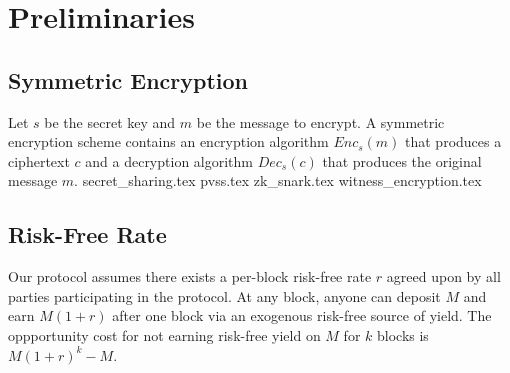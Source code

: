 \section{Preliminaries}
    \subsection{Symmetric Encryption}
    Let $s$ be the secret key and $m$ be the message to encrypt.
    A symmetric encryption scheme contains an encryption algorithm $Enc_s(m)$ that produces a ciphertext $c$ and a decryption algorithm $Dec_s(c)$ that produces the original message $m$.
    {secret_sharing.tex}
    {pvss.tex}
    {zk_snark.tex}
    {witness_encryption.tex}
    \subsection{Risk-Free Rate}\label{subsection:prelim-rfr}
    Our protocol assumes there exists a per-block risk-free rate $r$ agreed upon by all parties participating in the protocol.
    At any block, anyone can deposit $M$ and earn $M(1 + r)$ after one block via an exogenous risk-free source of yield.
    The oppportunity cost for not earning risk-free yield on $M$ for $k$ blocks is $M(1 + r)^k - M$.

